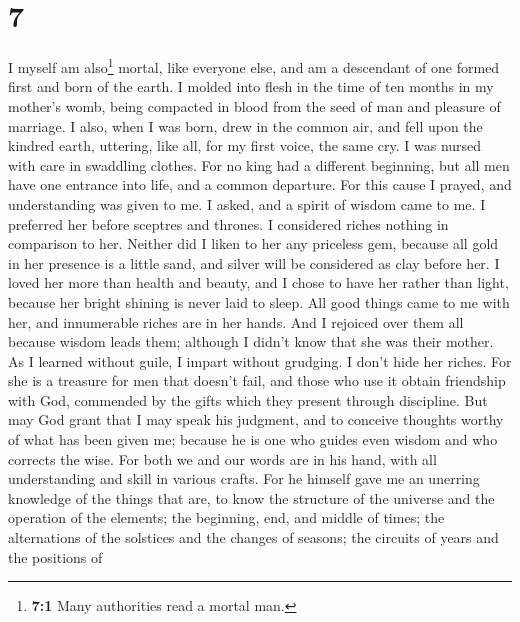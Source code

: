 \hypertarget{section-6}{%
\section{7}\label{section-6}}

 I myself am also\footnote{\textbf{7:1} Many authorities
  read a mortal man.} mortal, like everyone else, and am a descendant of
one formed first and born of the earth.  I molded into
flesh in the time of ten months in my mother's womb, being compacted in
blood from the seed of man and pleasure of marriage.  I
also, when I was born, drew in the common air, and fell upon the kindred
earth, uttering, like all, for my first voice, the same cry.
 I was nursed with care in swaddling clothes.
 For no king had a different beginning,  but
all men have one entrance into life, and a common departure.
 For this cause I prayed, and understanding was given to
me. I asked, and a spirit of wisdom came to me.  I
preferred her before sceptres and thrones. I considered riches nothing
in comparison to her.  Neither did I liken to her any
priceless gem, because all gold in her presence is a little sand, and
silver will be considered as clay before her.  I loved
her more than health and beauty, and I chose to have her rather than
light, because her bright shining is never laid to sleep.
 All good things came to me with her, and innumerable
riches are in her hands.  And I rejoiced over them all
because wisdom leads them; although I didn't know that she was their
mother.  As I learned without guile, I impart without
grudging. I don't hide her riches.  For she is a treasure
for men that doesn't fail, and those who use it obtain friendship with
God, commended by the gifts which they present through discipline.
 But may God grant that I may speak his judgment, and to
conceive thoughts worthy of what has been given me; because he is one
who guides even wisdom and who corrects the wise.  For
both we and our words are in his hand, with all understanding and skill
in various crafts.  For he himself gave me an unerring
knowledge of the things that are, to know the structure of the universe
and the operation of the elements;  the beginning, end,
and middle of times; the alternations of the solstices and the changes
of seasons;  the circuits of years and the positions of
